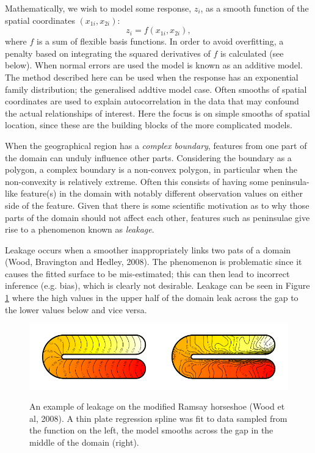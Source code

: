 \documentclass[useAMS,referee]{biom}
\begin{document}
Mathematically, we wish to model some response, $z_i$, as a smooth function of the spatial coordinates $(x_{1i}, x_{2i})$:
\begin{equation*}
z_i = f(x_{1i}, x_{2i}),
\end{equation*}
where $f$ is a sum of flexible basis functions. In order to avoid overfitting, a penalty based on integrating the squared derivatives of $f$ is calculated (see below). When normal errors are used the model is known as an additive model. The method described here can be used when the response has an exponential family distribution; the generalised addtive model case. Often smooths of spatial coordinates are used to explain autocorrelation in the data that may confound the actual relationships of interest. Here the focus is on simple smooths of spatial location, since these are the building blocks of the more complicated models.

When the geographical region has a \emph{complex boundary}, features from one part of the domain can unduly influence other parts. Considering the boundary as a polygon, a complex boundary is a non-convex polygon, in particular when the non-convexity is relatively extreme. Often this consists of having some peninsula-like feature(s) in the domain with notably different observation values on either side of the feature. Given that there is some scientific motivation as to why those parts of the domain should not affect each other, features such as peninsulae give rise to a phenomenon known as \emph{leakage}.

Leakage occurs when a smoother inappropriately links two pats of a domain (Wood, Bravington and Hedley, 2008). The phenomenon is problematic since it causes the fitted surface to be mis-estimated; this can then lead to incorrect inference (e.g. bias), which is clearly not desirable. Leakage can be seen in Figure \ref{leakage} where the high values in the upper half of the domain leak across the gap to the lower values below and vice versa.

\begin{figure}
\centering
\includegraphics[width=\textwidth]{figs/ramsay-leak.pdf}\\
\caption{An example of leakage on the modified Ramsay horseshoe (Wood et al, 2008). A thin plate regression spline was fit to data sampled from the function on the left, the model smooths across the gap in the middle of the domain (right).}
\label{leakage}
\end{figure}
\end{document}
